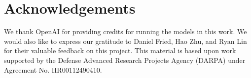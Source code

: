 \section*{Acknowledgements}
We thank OpenAI for providing credits for running the models in this work.
We would also like to express our gratitude to Daniel Fried, Hao Zhu, and Ryan Lin for their valuable feedback on this project.
This material is based upon work supported by the Defense Advanced Research Projects Agency (DARPA) under Agreement No. HR00112490410.
